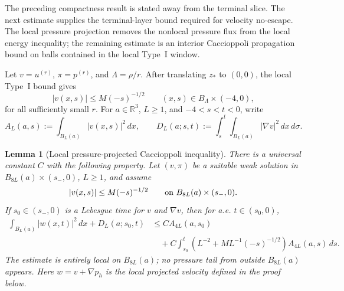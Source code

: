 \documentclass[11pt]{amsart}
\numberwithin{equation}{section}
\theoremstyle{plain}
\newtheorem{lemma}[lemma]{Lemma}
\theoremstyle{definition}
\theoremstyle{remark}
\begin{document}
The preceding compactness result is stated away from the terminal
slice.  The next estimate supplies the terminal-layer bound required for
velocity no-escape.  The local pressure projection removes the nonlocal pressure
flux from the local energy inequality; the remaining estimate is an interior
Caccioppoli propagation bound on balls contained in the local Type~I window.

Let \(v=u^{(r)}\), \(\pi=p^{(r)}\), and
\(\Lambda=\rho/r\).  After translating \(z_*\) to \((0,0)\), the local Type~I
bound gives
\[
   |v(x,s)|\le M(-s)^{-1/2}
   \qquad (x,s)\in B_\Lambda\times(-4,0),
\]
for all sufficiently small \(r\).  For \(a\in\mathbb R^3\), \(L\ge1\), and
\(-4<s<t<0\), write
\[
   A_L(a,s):=\int_{B_L(a)}|v(x,s)|^2\,dx,\qquad
   D_L(a;s,t):=\int_s^t\int_{B_L(a)}|\nabla v|^2\,dx\,d\sigma .
\]

\begin{lemma}[Local pressure-projected Caccioppoli inequality]
\label{lem:local-pressure-projected-caccioppoli}
There is a universal constant \(C\) with the following property.  Let
\((v,\pi)\) be a suitable weak solution in
\(B_{8L}(a)\times(s_-,0)\), \(L\ge1\), and assume
\[
   |v(x,s)|\le M(-s)^{-1/2}
   \qquad\hbox{on }B_{8L}(a)\times(s_-,0).
\]
If \(s_0\in(s_-,0)\) is a Lebesgue time for \(v\) and \(\nabla v\), then for
a.e. \(t\in(s_0,0)\),
\begin{equation}\label{eq:pressure-projected-caccioppoli}
\begin{aligned}
   \int_{B_L(a)}|w(x,t)|^2\,dx+D_L(a;s_0,t)
   &\le
   C A_{4L}(a,s_0)                                      \\
   &\quad
   +C\int_{s_0}^{t}
      \left(L^{-2}+ML^{-1}(-s)^{-1/2}\right)
      A_{4L}(a,s)\,ds .
\end{aligned}
\end{equation}
The estimate is entirely local on \(B_{8L}(a)\); no pressure tail from outside
\(B_{8L}(a)\) appears.  Here \(w=v+\nabla p_h\) is the local projected velocity
defined in the proof below.
\end{lemma}
\end{document}
